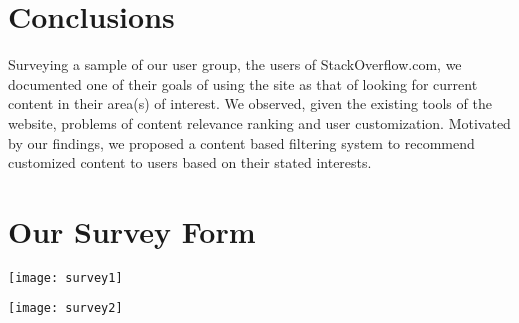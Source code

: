 \documentclass{sig-alternate-05-2015}
\begin{document}
\section{Conclusions}
Surveying a sample of our user group, the users of StackOverflow.com, we documented one of their goals of using the site as that of looking for current content in their area(s) of interest. We observed, given the existing tools of the website, problems of content relevance ranking and user customization. Motivated by our findings, we proposed a content based filtering system to recommend customized content to users based on their stated interests. 

%

%
%
\appendix
\section{Our Survey Form}
\label{app}
\begin{figure*}[!h]
\centering
\texttt{[image: survey1]}
\end{figure*}
\begin{figure*}[!h]
\centering
\texttt{[image: survey2]}
\end{figure*}
\end{document}
